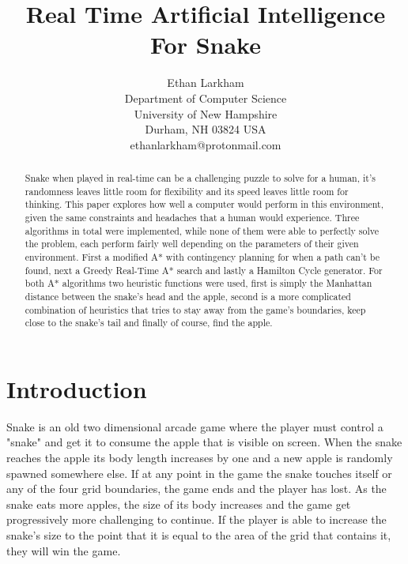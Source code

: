 \documentclass[letterpaper]{article} %
\begin{document}
%
\title{Real Time Artificial Intelligence For Snake}
\author{Ethan Larkham\\
Department of Computer Science\\
University of New Hampshire\\
Durham, NH 03824 USA \\
ethanlarkham@protonmail.com\\
}
\maketitle
\begin{abstract}
  Snake when played in real-time can be a challenging puzzle to solve for a human, it's randomness leaves little room for flexibility and its speed leaves little room for thinking. This paper explores how well a computer would perform in this environment, given the same constraints and headaches that a human would experience. Three algorithms in total were implemented, while none of them were able to perfectly solve the problem, each perform fairly well depending on the parameters of their given environment. First a modified A* with contingency planning for when a path can't be found, next a Greedy Real-Time A* search and lastly a Hamilton Cycle generator. For both A* algorithms two heuristic functions were used, first is simply the Manhattan distance between the snake's head and the apple, second is a more complicated combination of heuristics that tries to stay away from the game's boundaries, keep close to the snake's tail and finally of course, find the apple.
\end{abstract}

\section{Introduction}
Snake is an old two dimensional arcade game where the player must control a "snake" and get it to consume the apple that is visible on screen. When the snake reaches the apple its body length increases by one and a new apple is randomly spawned somewhere else. If at any point in the game the snake touches itself or any of the four grid boundaries, the game ends and the player has lost. As the snake eats more apples, the size of its body increases and the game get progressively  more challenging to continue. If the player is able to increase the snake's size to the point that it is equal to the area of the grid that contains it, they will win the game.
\end{document}
